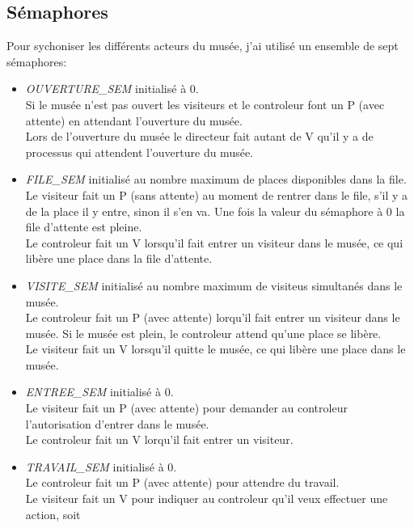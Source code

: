 \documentclass[a4paper,12pt,DIV=16]{scrreprt}
\begin{document}
    \subsection*{Sémaphores}

    Pour sychoniser les différents acteurs du musée, j'ai utilisé un ensemble de sept sémaphores:
    \begin{itemize}
        \item \emph{OUVERTURE\_SEM} initialisé à 0.\\
            Si le musée n'est pas ouvert les visiteurs et le controleur font un P (avec attente)
            en attendant l'ouverture du musée.\\
            Lors de l'ouverture du musée le directeur fait autant de V qu'il y a de processus
            qui attendent l'ouverture du musée.
        \item \emph{FILE\_SEM} initialisé au nombre maximum de places disponibles dans la file.\\
            Le visiteur fait un P (sans attente) au moment de rentrer dans le file,
            s'il y a de la place il y entre, sinon il s'en va.
            Une fois la valeur du sémaphore à 0 la file d'attente est pleine.\\
            Le controleur fait un V lorsqu'il fait entrer un visiteur dans le musée, ce qui libère
            une place dans la file d'attente.
        \item \emph{VISITE\_SEM} initialisé au nombre maximum de visiteus simultanés dans le musée.\\
            Le controleur fait un P (avec attente) lorqu'il fait entrer un visiteur dans le musée.
            Si le musée est plein, le controleur attend qu'une place se libère.\\
            Le visiteur fait un V lorsqu'il quitte le musée, ce qui libère une place dans le musée.
        \item \emph{ENTREE\_SEM} initialisé à 0.\\
            Le visiteur fait un P (avec attente) pour demander au controleur l'autorisation d'entrer
            dans le musée.\\
            Le controleur fait un V lorqu'il fait entrer un visiteur.
        \item \emph{TRAVAIL\_SEM} initialisé à 0.\\
            Le controleur fait un P (avec attente) pour attendre du travail.\\
            Le visiteur fait un V pour indiquer au controleur qu'il veux effectuer une action, soit

\end{itemize}
\end{document}
